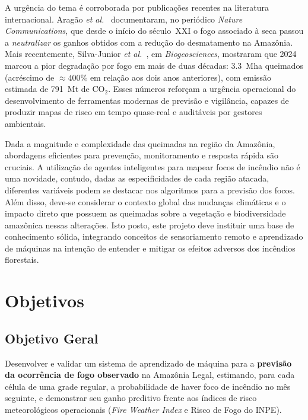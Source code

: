 \documentclass[tcc2]{uftex}
\begin{document}
A urgência do tema é corroborada por publicações recentes na literatura internacional. Aragão \emph{et al.}~\cite{aragao2018amazon} documentaram, no periódico \emph{Nature Communications}, que desde o início do século~XXI o fogo associado à seca passou a \emph{neutralizar} os ganhos obtidos com a redução do desmatamento na Amazônia. Mais recentemente, Silva-Junior \emph{et al.}~\cite{silvajunior2025amazon}, em \emph{Biogeosciences}, mostraram que 2024 marcou a pior degradação por fogo em mais de duas décadas: \SI{3,3}{\mega\hectare} queimados (acréscimo de \(\approx 400\%\) em relação aos dois anos anteriores), com emissão estimada de \SI{791}{\mega\tonne} de CO$_{2}$. Esses números reforçam a urgência operacional do desenvolvimento de ferramentas modernas de previsão e vigilância, capazes de produzir mapas de risco em tempo quase-real e auditáveis por gestores ambientais.

Dada a magnitude e complexidade das queimadas na região da Amazônia, abordagens eficientes para prevenção, monitoramento e resposta rápida são cruciais. A utilização de agentes inteligentes para mapear focos de incêndio não é uma novidade, contudo, dadas as especificidades de cada região atacada, diferentes variáveis podem se destacar nos algoritmos para a previsão dos focos. Além disso, deve-se considerar o contexto global das mudanças climáticas e o impacto direto que possuem as queimadas sobre a vegetação e biodiversidade amazônica nessas alterações. Isto posto, este projeto deve instituir uma base de conhecimento sólida, integrando conceitos de sensoriamento remoto e aprendizado de máquinas na intenção de entender e mitigar os efeitos adversos dos incêndios florestais.


\section{Objetivos}

\subsection{Objetivo Geral}

Desenvolver e validar um sistema de aprendizado de máquina para a \textbf{previsão da ocorrência de fogo observado} na Amazônia Legal, estimando, para cada célula de uma grade regular, a probabilidade de haver foco de incêndio no mês seguinte, e demonstrar seu ganho preditivo frente aos índices de risco meteorológicos operacionais (\emph{Fire Weather Index} e Risco de Fogo do INPE).
\end{document}
